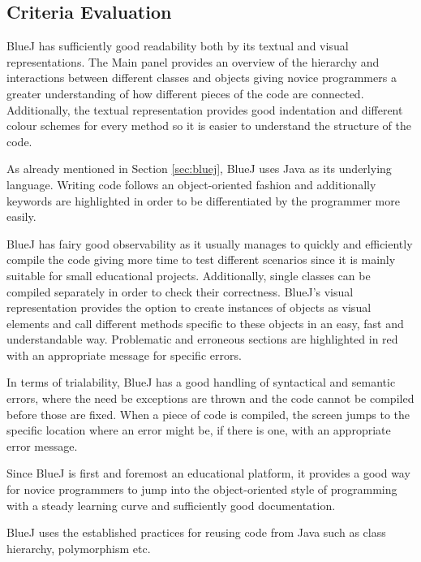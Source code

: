 \subsection{Criteria Evaluation}
\begin{description}[style=nextline]
\item[Readability]
BlueJ has sufficiently good readability both by its textual and visual representations. The Main panel provides an overview of the hierarchy and interactions between different classes and objects giving novice programmers a greater understanding of how different pieces of the code are connected. Additionally, the textual representation provides good indentation and different colour schemes for every method so it is easier to understand the structure of the code.
\item[Writability]
As already mentioned in Section \ref{sec:bluej}, BlueJ uses Java as its underlying language. Writing code follows an object-oriented fashion and additionally keywords are highlighted in order to be differentiated by the programmer more easily.
\item[Observability]
BlueJ has fairy good observability as it usually manages to quickly and efficiently compile the code giving more time to test different scenarios since it is mainly suitable for small educational projects. Additionally, single classes can be compiled separately in order to check their correctness. BlueJ's visual representation provides the option to create instances of objects as visual elements and call different methods specific to these objects in an easy, fast and understandable way. Problematic and erroneous sections are highlighted in red with an appropriate message for specific errors.  
\item[Trialability]
In terms of trialability, BlueJ has a good handling of syntactical and semantic errors, where the need be exceptions are thrown and the code cannot be compiled before those are fixed. When a piece of code is compiled, the screen jumps to the specific location where an error might be, if there is one, with an appropriate error message.
\item[Learnability]
Since BlueJ is first and foremost an educational platform, it provides a good way for novice programmers to jump into the object-oriented style of programming with a steady learning curve and sufficiently good documentation.
\item[Reusability]
BlueJ uses the established practices for reusing code from Java such as class hierarchy, polymorphism etc.

\end{description}
